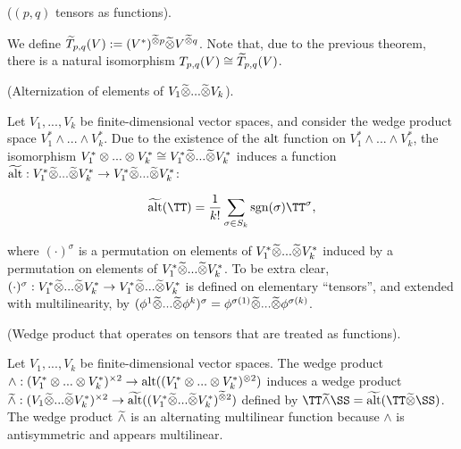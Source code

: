 \begin{defn}
    ($(p, q)$ tensors as functions).
    
    We define $\widetilde{T}_{p,q}(V) := (V^*)^{\widetilde{\otimes} p} \widetilde{\otimes} V^{\widetilde{\otimes} q}$. Note that, due to the previous theorem, there is a natural isomorphism $T_{p,q}(V) \cong \widetilde{T}_{p,q}(V)$.
\end{defn}

\begin{deriv}
    (Alternization of elements of $V_1 \widetilde{\otimes} ... \widetilde{\otimes} V_k$).
    
    Let $V_1, ..., V_k$ be finite-dimensional vector spaces, and consider the wedge product space $V_1^* \wedge ... \wedge V_k^*$. Due to the existence of the $\text{alt}$ function on $V_1^* \wedge ... \wedge V_k^*$, the isomorphism $V_1^* \otimes ... \otimes V_k^* \cong V_1^* \widetilde{\otimes} ... \widetilde{\otimes} V_k^*$ induces a function $\widetilde{\text{alt}}:V_1^* \widetilde{\otimes} ... \widetilde{\otimes} V_k^* \rightarrow V_1^* \widetilde{\otimes} ... \widetilde{\otimes} V_k^*$:
    
    \begin{align*}
        \talt(\TT) = \frac{1}{k!} \sum_{\sigma \in S_k} \sgn(\sigma) \TT^\sigma,
    \end{align*}
    
    where $(\cdot)^\sigma$ is a permutation on elements of $V_1^* \widetilde{\otimes} ... \widetilde{\otimes} V_k^*$ induced by a permutation on elements of $V_1^* \widetilde{\otimes} ... \widetilde{\otimes} V_k^*$. To be extra clear, $(\cdot)^\sigma:V_1^* \widetilde{\otimes} ... \widetilde{\otimes} V_k^* \rightarrow V_1^* \widetilde{\otimes} ... \widetilde{\otimes} V_k^*$ is defined on elementary ``tensors'', and extended with multilinearity, by $(\phi^1 \widetilde{\otimes} ... \widetilde{\otimes} \phi^k)^\sigma = \phi^{\sigma(1)} \widetilde{\otimes} ... \widetilde{\otimes} \phi^{\sigma(k)}$.
\end{deriv}

\begin{deriv}
    (Wedge product that operates on tensors that are treated as functions).
    
    Let $V_1, ..., V_k$ be finite-dimensional vector spaces. The wedge product ${\wedge:(V_1^* \otimes ... \otimes V_k^*)^{\times 2} \rightarrow \text{alt}((V_1^* \otimes ... \otimes V_k^*)^{\otimes 2})}$ induces a wedge product ${\widetilde{\wedge}: (V_1 \widetilde{\otimes} ... \widetilde{\otimes} V_k^*)^{\times 2} \rightarrow \widetilde{\text{alt}}((V_1^* \widetilde{\otimes} ... \widetilde{\otimes} V_k^*)^{\widetilde{\otimes} 2})}$ defined by $\TT \twedge \SS = \talt(\TT \totimes \SS)$. The wedge product $\widetilde{\wedge}$ is an alternating multilinear function because $\wedge$ is antisymmetric and appears multilinear.
\end{deriv}


